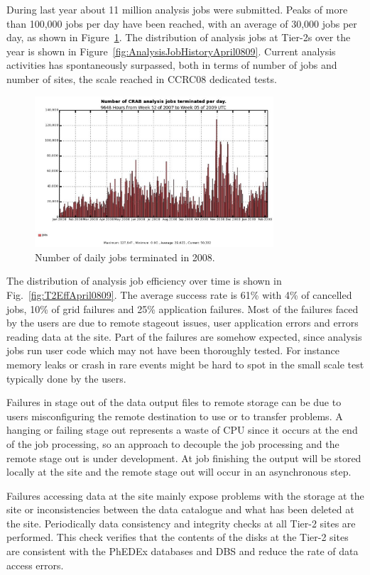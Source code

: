 During last year about 11 million analysis jobs were submitted.  Peaks
of more than 100,000 jobs per day have been reached, with an average
of 30,000 jobs per day, as shown in Figure~\ref{fig:jobs}.
The distribution of analysis jobs at Tier-2s over the year is shown in Figure~\ref{fig:AnalysisJobHistoryApril0809}. Current analysis activities has spontaneously surpassed, both in terms of number of jobs and number of sites, the scale reached in CCRC08 dedicated tests. 
\begin{figure}
\includegraphics[width=3.5in]{crabjobsdaily.eps}
\caption{Number of daily jobs terminated in 2008. }
\label{fig:jobs}
\end{figure}

The distribution of analysis job efficiency over time is shown in Fig.~\ref{fig:T2EffApril0809}. The average success rate is 61\% with 4\% of cancelled jobs, 10\% of grid failures and 25\% application failures.
Most of the failures faced by the users are due to remote stageout issues, user application errors and errors reading data at the site. 
Part of the failures are somehow expected, since analysis jobs run user code which may not have been thoroughly tested. For instance memory leaks or crash in rare events might be hard to spot in the small scale test typically done by the users.

Failures in stage out of the data output files to remote storage can be due 
to users misconfiguring the remote destination to use or to transfer problems.
A hanging or failing stage out represents a waste of CPU since it occurs at 
the end of the job processing, so an approach to decouple the job processing and the remote stage out is under development. At job finishing the output will be stored locally at the site and the remote stage out will occur in an asynchronous step.

Failures accessing data at the site mainly expose problems with the storage at the site or inconsistencies between the data catalogue and what has been deleted at the site. 
Periodically data consistency and integrity checks at all Tier-2 sites are performed. This check verifies that the contents of the disks at the Tier-2 sites are consistent with the PhEDEx databases and DBS and reduce the rate of data access errors.

